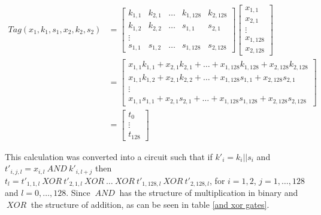 \documentclass[10pt,a4paper]{article}
\newcommand{\AND}{\ensuremath{~AND~}}
\newcommand{\XOR}{\ensuremath{~XOR~}}
\begin{document}
\begin{align*}
    Tag(x_1, k_1, s_1, x_2, k_2, s_2)
    &= 
    \begin{bmatrix}
        k_{1,1} & k_{2,1} & \dots & k_{1,128} & k_{2,128}    \\
        k_{1,2 }& k_{2,2} & \dots & s_{1,1}   & s_{2,1}      \\
        \vdots                                               \\
        s_{1,1} & s_{1,2} & \dots & s_{1,128} & s_{2,128}
    \end{bmatrix}
    \begin{bmatrix}
        x_{1,1}    \\
        x_{2,1}    \\
        \vdots     \\
        x_{1,128}  \\
        x_{2,128}
    \end{bmatrix}  \\
    &=
    \begin{bmatrix}
        x_{1,1}k_{1,1} + x_{2,1}k_{2,1} + \dots + x_{1,128}k_{1,128} + x_{2,128}k_{2,128}    \\
        x_{1,1}k_{1,2} + x_{2,1}k_{2,2} + \dots + x_{1,128}s_{1,1} + x_{2,128}s_{2,1}      \\
        \vdots \\
        x_{1,1}s_{1,1} + x_{2,1}s_{2,1} + \dots + x_{1,128}s_{1,128} + x_{2,128}s_{2,128}        
    \end{bmatrix}    \\
    &= 
    \begin{bmatrix}
        t_0    \\
        \vdots    \\
        t_{128}
    \end{bmatrix}
\end{align*}

This calculation was converted into a circuit such that if $k'_i= k_i||s_i$ and$t'_{i,j,l} = x_{i,l} \AND k'_{i,l+j}$ then $t_l = t'_{1,1,l} \XOR t'_{2,1,l} \XOR \dots \XOR t'_{1,128,l} \XOR t'_{2,128,l}$, for $i=1,2$, $j=1,\dots, 128$ and $l=0,\dots, 128$. Since $\AND$ has the structure of multiplication in binary and $\XOR$ the structure of addition, as can be seen in table \ref{and xor gates}.
\end{document}
